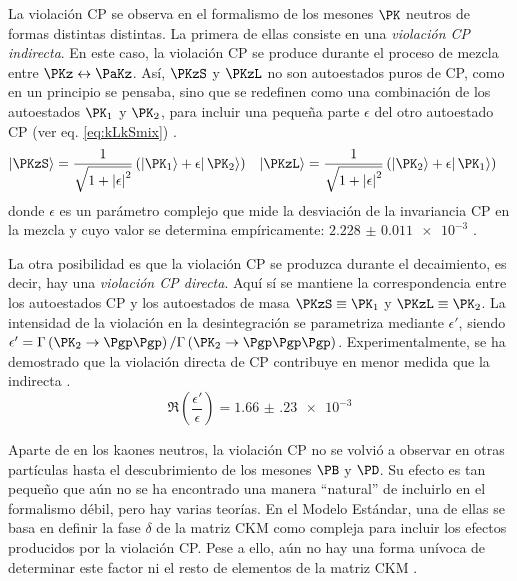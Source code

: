 La violación CP se observa en el formalismo de los mesones $\PK$ neutros de formas distintas distintas. La primera de ellas consiste en una \textit{violación CP indirecta}. En este caso, la violación CP se produce durante el proceso de mezcla entre $\PKz \leftrightarrow \PaKz$. Así, $\PKzS$ y $\PKzL$ no son autoestados puros de CP, como en un principio se pensaba, sino que se redefinen como una combinación de los autoestados $\PK_{1}$ y $\PK_{2}$, para incluir una pequeña parte $\epsilon$ del otro autoestado CP (ver eq. \ref{eq:kLkSmix}) \cite{Thomson}.
\begin{align}
|\PKzS\rangle &= \dfrac{1}{\sqrt{1+\left| \epsilon\right| ^{2}}}\left( \left| \PK_{1}\rangle +\epsilon \right| \PK_{2}\rangle \right) &
|\PKzL\rangle &= \dfrac{1}{\sqrt{1+\left| \epsilon\right| ^{2}}}\left( \left| \PK_{2}\rangle +\epsilon \right| \PK_{1}\rangle \right)\label{eq:kLkSmix}
\end{align}
donde $\epsilon$ es un parámetro complejo que mide la desviación de la invariancia CP en la mezcla y cuyo valor se determina empíricamente: $\num{2.228(11)e-3}$ \cite{Zyla}.

La otra posibilidad es que la violación CP se produzca durante el decaimiento, es decir, hay una \textit{violación CP directa}. Aquí sí se mantiene la correspondencia entre los autoestados CP y los autoestados de masa $\PKzS \equiv \PK_{1}$ y $\PKzL \equiv \PK_{2}$. La intensidad de la violación en la desintegración se parametriza mediante $\epsilon '$, siendo $\epsilon '=\Gamma\left(\PK_{2}\rightarrow \Pgp\Pgp \right) / \Gamma\left(\PK_{2}\rightarrow \Pgp\Pgp\Pgp \right)$. Experimentalmente, se ha demostrado que la violación directa de CP contribuye en menor medida que la indirecta \cite{Thomson}.
\begin{equation}
\Re\left(\dfrac{\epsilon '}{\epsilon}\right)=\num{1.66(23)e-3}
\end{equation}

Aparte de en los kaones neutros, la violación CP no se volvió a observar en otras partículas hasta el descubrimiento de los mesones $\PB$ y $\PD$. Su efecto es tan pequeño que aún no se ha encontrado una manera ``natural'' de incluirlo en el formalismo débil, pero hay varias teorías. En el Modelo Estándar, una de ellas se basa en definir la fase $\delta$ de la matriz CKM como compleja para incluir los efectos producidos por la violación CP. Pese a ello, aún no hay una forma unívoca de determinar este factor ni el resto de elementos de la matriz CKM \cite{Griffiths2008}.

